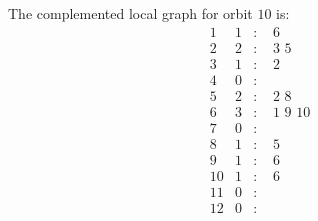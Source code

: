 \documentclass[12pt]{article}
\begin{document}
The complemented local graph for orbit $10$ is:
\begin{equation*}
\begin{array}{rrcl}
1&1&:&\,\,6\\
2&2&:&\,\,3\,\,5\\
3&1&:&\,\,2\\
4&0&:&\\
5&2&:&\,\,2\,\,8\\
6&3&:&\,\,1\,\,9\,\,10\\
7&0&:&\\
8&1&:&\,\,5\\
9&1&:&\,\,6\\
10&1&:&\,\,6\\
11&0&:&\\
12&0&:&\\
\end{array}
\end{equation*}
\end{document}
